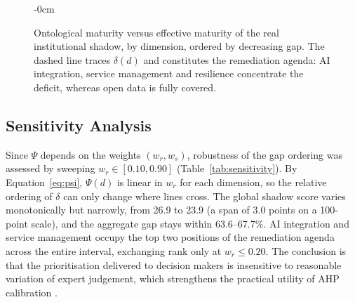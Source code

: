 \documentclass[engproc,article,submit,moreauthors]{Definitions/mdpi}
\begin{document}
\begin{figure}[H]
\begin{adjustwidth}{-\extralength}{0cm}
\centering
{}
\end{adjustwidth}
\caption{Ontological maturity versus effective maturity of the real institutional shadow, by dimension, ordered by decreasing gap. The dashed line traces $\delta(d)$ and constitutes the remediation agenda: AI integration, service management and resilience concentrate the deficit, whereas open data is fully covered.\label{fig:gaps}}
\end{figure}

\subsection{Sensitivity Analysis}
Since $\Psi$ depends on the weights $(w_r,w_s)$, robustness of the gap ordering was assessed by sweeping $w_r \in [0.10,0.90]$ (Table~\ref{tab:sensitivity}). By Equation~\eqref{eq:psi}, $\Psi(d)$ is linear in $w_r$ for each dimension, so the relative ordering of $\delta$ can only change where lines cross. The global shadow score varies monotonically but narrowly, from 26.9 to 23.9 (a span of 3.0 points on a 100-point scale), and the aggregate gap stays within 63.6--67.7\%. AI integration and service management occupy the top two positions of the remediation agenda across the entire interval, exchanging rank only at $w_r \leq 0.20$. The conclusion is that the prioritisation delivered to decision makers is insensitive to reasonable variation of expert judgement, which strengthens the practical utility of AHP calibration \cite{Saaty1990}.
\end{document}
